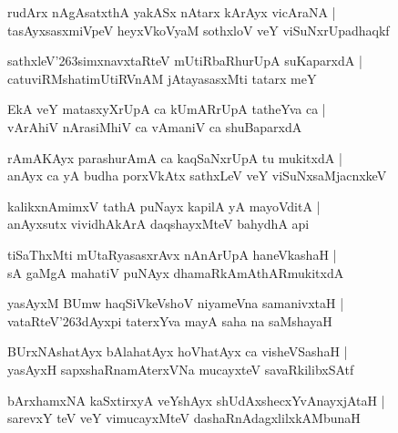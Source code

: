 \documentclass[twoside,12pt,openright]{book}
\def\S{\char'263}
\newcounter{shloka}[chapter]
\begin{document}
\begin{shloka}%
rudArx nAgAsatxthA yakASx nAtarx kArAyx vicAraNA |\\
tasAyxsasxmiVpeV heyxVkoVyaM sothxloV veY viSuNxrUpadhaqkf 
\end{shloka}

\begin{shloka}%
sathxleV\S simxnavxtaRteV mUtiRbaRhurUpA suKaparxdA |\\
catuviRMshatimUtiRVnAM jAtayasasxMti tatarx meY
\end{shloka}

\begin{shloka}%
EkA veY matasxyXrUpA ca kUmARrUpA tatheYva ca |\\
vArAhiV nArasiMhiV ca vAmaniV ca shuBaparxdA 
\end{shloka}

\begin{shloka}%
rAmAKAyx parashurAmA ca kaqSaNxrUpA tu mukitxdA |\\
anAyx ca yA budha porxVkAtx sathxLeV veY viSuNxsaMjacnxkeV 
\end{shloka}

\begin{shloka}%
kalikxnAmimxV tathA puNayx kapilA yA mayoVditA |\\
anAyxsutx vividhAkArA daqshayxMteV bahydhA api
\end{shloka}

\begin{shloka}%
tiSaThxMti mUtaRyasasxrAvx nAnArUpA haneVkashaH |\\
sA gaMgA mahatiV puNAyx dhamaRkAmAthARmukitxdA 
\end{shloka}

\begin{shloka}%
yasAyxM BUmw haqSiVkeVshoV niyameVna samanivxtaH |\\
vataRteV\S dAyxpi taterxYva mayA saha na saMshayaH
\end{shloka}

\begin{shloka}%
BUrxNAshatAyx bAlahatAyx hoVhatAyx ca visheVSashaH |\\
yasAyxH sapxshaRnamAterxVNa mucayxteV savaRkilibxSAtf 
\end{shloka}

\begin{shloka}%
bArxhamxNA kaSxtirxyA veYshAyx shUdAxshecxYvAnayxjAtaH |\\
sarevxY teV veY vimucayxMteV dashaRnAdagxlilxkAMbunaH 
\end{shloka}
\end{document}
